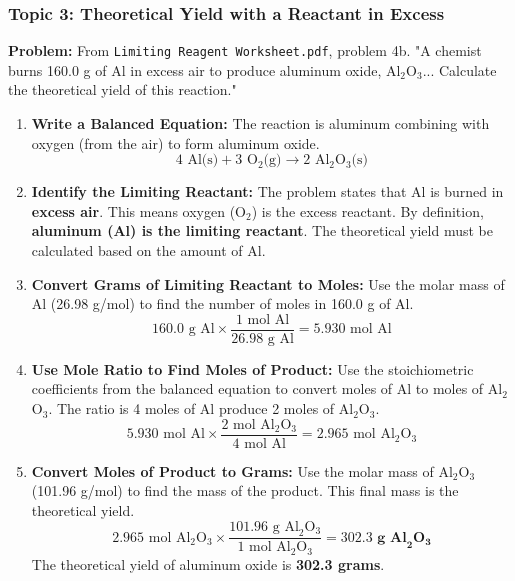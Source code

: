 \documentclass{article}
\begin{document}
\subsubsection*{Topic 3: Theoretical Yield with a Reactant in Excess}
\textbf{Problem:} From \texttt{Limiting Reagent Worksheet.pdf}, problem 4b. "A chemist burns 160.0 g of Al in excess air to produce aluminum oxide, Al$_2$O$_3$... Calculate the theoretical yield of this reaction."
\begin{enumerate}
    \item \textbf{Write a Balanced Equation:} The reaction is aluminum combining with oxygen (from the air) to form aluminum oxide.
    \[ 4\text{ Al(s)} + 3\text{ O}_2\text{(g)} \rightarrow 2\text{ Al}_2\text{O}_3\text{(s)} \]

    \item \textbf{Identify the Limiting Reactant:} The problem states that Al is burned in \textbf{excess air}. This means oxygen (O$_2$) is the excess reactant. By definition, \textbf{aluminum (Al) is the limiting reactant}. The theoretical yield must be calculated based on the amount of Al.

    \item \textbf{Convert Grams of Limiting Reactant to Moles:} Use the molar mass of Al (26.98 g/mol) to find the number of moles in 160.0 g of Al.
    \[ 160.0 \text{ g Al} \times \frac{1 \text{ mol Al}}{26.98 \text{ g Al}} = 5.930 \text{ mol Al} \]

    \item \textbf{Use Mole Ratio to Find Moles of Product:} Use the stoichiometric coefficients from the balanced equation to convert moles of Al to moles of Al$_2$O$_3$. The ratio is 4 moles of Al produce 2 moles of Al$_2$O$_3$.
    \[ 5.930 \text{ mol Al} \times \frac{2 \text{ mol Al}_2\text{O}_3}{4 \text{ mol Al}} = 2.965 \text{ mol Al}_2\text{O}_3 \]

    \item \textbf{Convert Moles of Product to Grams:} Use the molar mass of Al$_2$O$_3$ (101.96 g/mol) to find the mass of the product. This final mass is the theoretical yield.
    \[ 2.965 \text{ mol Al}_2\text{O}_3 \times \frac{101.96 \text{ g Al}_2\text{O}_3}{1 \text{ mol Al}_2\text{O}_3} = \mathbf{302.3 \text{ g Al}_2\text{O}_3} \]
    The theoretical yield of aluminum oxide is \textbf{302.3 grams}.
\end{enumerate}

\newpage

\end{document}

